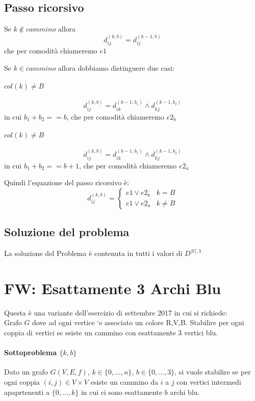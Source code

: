 \documentclass[12pt, a4paper, openany]{book}
\begin{document}
\subsection*{Passo ricorsivo}
Se $k \notin cammino$ allora
\begin{equation*}
	d_{ij}^{(k,b)} = d_{ij}^{(k-1,b)}
\end{equation*}
che per comodità chiameremo $e1$

Se $k \in cammino$ allora dobbiamo distinguere due casi:
\paragraph{$col(k) \neq B$}
\begin{equation*}
	d_{ij}^{(k,b)} = d_{ik}^{(k-1,b_1)} \land d_{kj}^{(k-1,b_2)}
\end{equation*}
in cui $b_1 + b_2 == b$, che per comodità chiameremo $e2_b$
\paragraph{$col(k) \neq B$}
\begin{equation*}
	d_{ij}^{(k,b)} = d_{ik}^{(k-1,b_1)} \land d_{kj}^{(k-1,b_2)}
\end{equation*}
in cui $b_1 + b_2 == b+1$, che per comodità chiameremo $e2_a$

Quindi l'equazione del passo ricorsivo è:
\begin{equation*}
	d^{(k,b)}_{ij} = \begin{cases}
		e1 \lor e2_b & k=B     \\
		e1 \lor e2_a & k\neq B
	\end{cases}
\end{equation*}

\subsection*{Soluzione del problema}
La soluzione del Problema è contenuta in tutti i valori di $D^{|V|,3}$

\section{FW: Esattamente 3 Archi Blu}
Questa è una variante dell'esercizio di settembre 2017 in cui si richiede:
\\Grafo $G$ dove ad ogni vertice `e associato un colore R,V,B. Stabilire per ogni
coppia di vertici se esiste un cammino con esattamente 3 vertici blu.
\paragraph*{Sottoproblema $\{k,b\}$}
Dato un grafo $G(V,E,f)$, $k\in \{0,...,n\}$, $b\in \{0,...,3\}$, si vuole stabilire se per ogni coppia $(i,j)\in V\times V$
esiste un cammino da $i$ a $j$ con vertici intermedi apaprtenenti a $\{0,...,k\}$ in cui ci sono esattamente $b$ archi blu.
\end{document}
